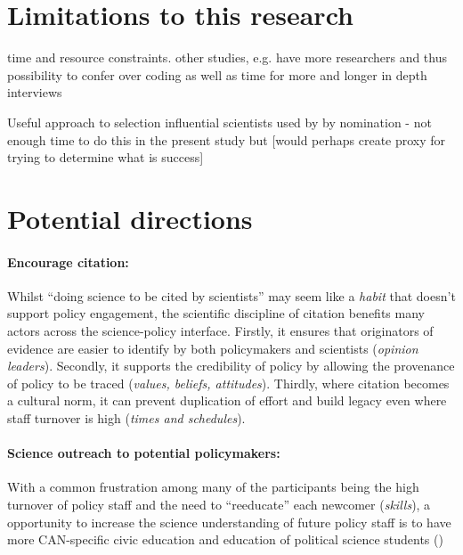 \section{Limitations to this research}
time and resource constraints. other studies, e.g. \cite{HaynesDCRHGS2011,OjanenBKP2021} have more researchers and thus possibility to confer over coding as well as time for more and longer in depth interviews

Useful approach to selection influential scientists used by \textcite{HaynesDCRHGS2011} by nomination - not enough time to do this in the present study but [would perhaps create proxy for trying to determine what is success]

\section{Potential directions}

\paragraph{Encourage citation:}

Whilst ``doing science to be cited by scientists'' may seem like a \emph{habit} that doesn't support policy engagement, the scientific discipline of citation benefits many actors across the science-policy interface. Firstly, it ensures that originators of evidence are easier to identify by both policymakers and scientists (\emph{opinion leaders}). Secondly, it supports the credibility of policy by allowing the provenance of policy to be traced (\emph{values, beliefs, attitudes}). Thirdly, where citation becomes a cultural norm, it can prevent duplication of effort and build legacy even where staff turnover is high (\emph{times and schedules}).

\paragraph{Science outreach to potential policymakers:}
With a common frustration among many of the participants being the high turnover of policy staff and the need to ``reeducate'' each newcomer (\emph{skills}), a opportunity to increase the science understanding of future policy staff is to have more CAN-specific civic education and education of political science students (\cite{DykeM2024})

